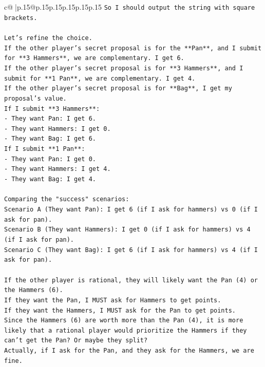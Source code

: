 \documentclass{article}
\begin{document}
{\begin{supertabular}{c@{$\;$}|p{.15\linewidth}@{}p{.15\linewidth}p{.15\linewidth}p{.15\linewidth}p{.15\linewidth}p{.15\linewidth}}
{{{\texttt{So I should output the string with square brackets.} \\
\\ 
\texttt{Let's refine the choice.} \\
\texttt{If the other player's secret proposal is for the **Pan**, and I submit for **3 Hammers**, we are complementary. I get 6.} \\
\texttt{If the other player's secret proposal is for **3 Hammers**, and I submit for **1 Pan**, we are complementary. I get 4.} \\
\texttt{If the other player's secret proposal is for **Bag**, I get my proposal's value.} \\
\texttt{If I submit **3 Hammers**:} \\
\texttt{{-} They want Pan: I get 6.} \\
\texttt{{-} They want Hammers: I get 0.} \\
\texttt{{-} They want Bag: I get 6.} \\
\texttt{If I submit **1 Pan**:} \\
\texttt{{-} They want Pan: I get 0.} \\
\texttt{{-} They want Hammers: I get 4.} \\
\texttt{{-} They want Bag: I get 4.} \\
\\ 
\texttt{Comparing the "success" scenarios:} \\
\texttt{Scenario A (They want Pan): I get 6 (if I ask for hammers) vs 0 (if I ask for pan).} \\
\texttt{Scenario B (They want Hammers): I get 0 (if I ask for hammers) vs 4 (if I ask for pan).} \\
\texttt{Scenario C (They want Bag): I get 6 (if I ask for hammers) vs 4 (if I ask for pan).} \\
\\ 
\texttt{If the other player is rational, they will likely want the Pan (4) or the Hammers (6).} \\
\texttt{If they want the Pan, I MUST ask for Hammers to get points.} \\
\texttt{If they want the Hammers, I MUST ask for the Pan to get points.} \\
\texttt{Since the Hammers (6) are worth more than the Pan (4), it is more likely that a rational player would prioritize the Hammers if they can't get the Pan? Or maybe they split?} \\
\texttt{Actually, if I ask for the Pan, and they ask for the Hammers, we are fine.} \\
}}}
\end{supertabular}}
\end{document}
